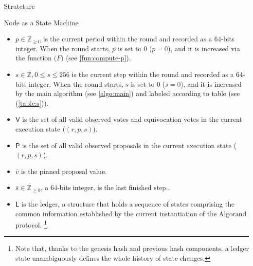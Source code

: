 \documentclass[10pt,a4paper]{article}
\begin{document}
\begin{section}{Strutcture}
\begin{subsection}{Node as a State Machine}
\begin{itemize}
    \item 
    $p\in\mathbb{Z}_{\ge 0}$ is the current {\sf period} within the round and recorded as 
    a 64-bits integer. When the round starts, $p$ is set to 0 ($p=0$), and it is 
    increased via the function $\mathcal(F)$ (see \ref{fun:compute-p}).
    
    \item 
    $s\in\mathbb{Z}, 0\le s\le 256$ is the current {\sf step} within the round 
    and recorded as a 64-bits integer. When the round starts, $s$ is set to 0 ($s=0$), 
    and it is increased by the main algorithm (see \ref{algo:main}) and 
    labeled according to table (see (\ref{table:s})).
    
    \item
    $\mathsf{V}$ is the set of all valid {\sf observed votes} and 
    {\sf equivocation votes} in the current execution state
    ($(r,p,s)$).
    
    \item
    $\mathsf{P}$ is the set of all valid {\sf observed proposals}
    in the current execution state ($(r,p,s)$).
    
    \item
    $\bar{v}$ is the {\sf pinned proposal value}.
    
    \item
    $\bar{s}\in\mathbb{Z}_{\ge 0}$, a 64-bits integer, is the {\sf last finished step}..
    
    \item
    $\mathsf{L}$ is the {\sf ledger}, a structure that holds a sequence of states comprising the common
    information established by the current instantiation of the Algorand protocol.
    \footnote{Note that, thanks to the genesis hash and previous 
    hash components, a ledger state unambiguously defines the whole history of state changes.}. 
    

\end{itemize}
\end{subsection}
\end{section}
\end{document}

